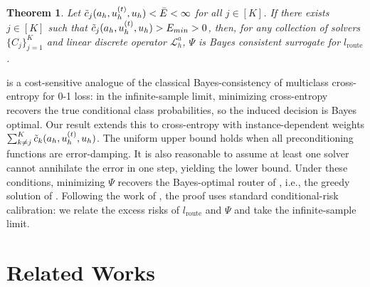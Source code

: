 \documentclass{article}
\newcommand{\ambuj}[1]{\textcolor{red}{AT: #1}}
\newtheorem{theorem}{Theorem}[section]
\begin{document}
\begin{theorem} \label{th:consistency}
    Let $\Tilde{c}_j(a_h, u^{(t)}_h, u_h) < \Bar{E} < \infty$  for all $j \in [K]$. If there exists $j\in [K]$ such that $\Tilde{c}_j(a_h, u^{(t)}_h, u_h) > E_{min} > 0$, then, for any collection of solvers $\{C_j\}_{j= 1}^K$ and linear discrete operator $\mathcal{L}_h^a$, $\Psi$ is Bayes consistent surrogate for $l_{\text{route}}$.
\end{theorem}
 is a cost-sensitive analogue of the classical Bayes-consistency of multiclass cross-entropy for 0-1 loss: in the infinite-sample limit, minimizing cross-entropy recovers the true conditional class probabilities, so the induced decision is Bayes optimal. Our result extends this to cross-entropy with instance-dependent weights $\sum_{k \neq j}^K\Tilde{c}_k(a_h, u^{(t)}_h, u_h)$. The uniform upper bound holds when all preconditioning functions are error-damping. It is also reasonable to assume at least one solver cannot annihilate the error in one step, yielding the lower bound. Under these conditions, minimizing $\Psi$ recovers the Bayes-optimal router of , i.e., the greedy solution of . Following the work of \citet{mao2024regression}, the proof uses standard conditional-risk calibration: we relate the excess risks of $l_{\text{route}}$ and $\Psi$ and take the infinite-sample limit.



\section{Related Works}
\end{document}
